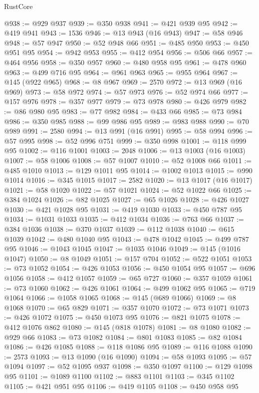 \begin{lexlean}{RustCore}
\begin{coremodule}
@938 := @929 @937
@939 := @350 @938
@941 := @421 @939 @95
@942 := @419 @941
@943 := 1536
@946 := @13 @943 (@16 @943)
@947 := @58 @946
@948 := @57 @947
@950 := @52 @948 @66
@951 := @485 @950
@953 := @450 @951 @95
@954 := @942 @953
@955 := @412 @954
@956 := @506 @66
@957 := @464 @956
@958 := @350 @957
@960 := @480 @958 @95
@961 := @478 @960
@963 := @499 @716 @95
@964 := @961 @963
@965 := @955 @964
@967 := @145 (@922 @965)
@968 := @8 @967
@969 := 2570
@972 := @13 @969 (@16 @969)
@973 := @58 @972
@974 := @57 @973
@976 := @52 @974 @66
@977 := @157 @976
@978 := @357 @977
@979 := @73 @978
@980 := @426 @979
@982 := @86 @980 @95
@983 := @77 @982
@984 := @433 @66
@985 := @73 @984
@986 := @350 @985
@988 := @99 @986 @95
@989 := @983 @988
@990 := @70 @989
@991 := 2580
@994 := @13 @991 (@16 @991)
@995 := @58 @994
@996 := @57 @995
@998 := @52 @996 @751
@999 := @350 @998
@1001 := @118 @999 @95
@1002 := @116 @1001
@1003 := 2048
@1006 := @13 @1003 (@16 @1003)
@1007 := @58 @1006
@1008 := @57 @1007
@1010 := @52 @1008 @66
@1011 := @485 @1010
@1013 := @129 @1011 @95
@1014 := @1002 @1013
@1015 := @990 @1014
@1016 := @345 @1015
@1017 := 2582
@1020 := @13 @1017 (@16 @1017)
@1021 := @58 @1020
@1022 := @57 @1021
@1024 := @52 @1022 @66
@1025 := @384 @1024
@1026 := @82 @1025
@1027 := @65 @1026
@1028 := @426 @1027
@1030 := @421 @1028 @95
@1031 := @419 @1030
@1033 := @450 @787 @95
@1034 := @1031 @1033
@1035 := @412 @1034
@1036 := @763 @66
@1037 := @384 @1036
@1038 := @370 @1037
@1039 := @112 @1038
@1040 := @615 @1039
@1042 := @480 @1040 @95
@1043 := @478 @1042
@1045 := @499 @787 @95
@1046 := @1043 @1045
@1047 := @1035 @1046
@1049 := @145 (@1016 @1047)
@1050 := @8 @1049
@1051 := @157 @704
@1052 := @522 @1051
@1053 := @73 @1052
@1054 := @426 @1053
@1056 := @450 @1054 @95
@1057 := @696 @1056
@1058 := @412 @1057
@1059 := @65 @727
@1060 := @357 @1059
@1061 := @73 @1060
@1062 := @426 @1061
@1064 := @499 @1062 @95
@1065 := @719 @1064
@1066 := @1058 @1065
@1068 := @145 (@689 @1066)
@1069 := @8 @1068
@1070 := @65 @829
@1071 := @357 @1070
@1072 := @73 @1071
@1073 := @426 @1072
@1075 := @450 @1073 @95
@1076 := @821 @1075
@1078 := @412 @1076 @862
@1080 := @145 (@818 @1078)
@1081 := @8 @1080
@1082 := @929 @66
@1083 := @73 @1082
@1084 := @801 @1083
@1085 := @82 @1084
@1086 := @426 @1085
@1088 := @118 @1086 @95
@1089 := @116 @1088
@1090 := 2573
@1093 := @13 @1090 (@16 @1090)
@1094 := @58 @1093
@1095 := @57 @1094
@1097 := @52 @1095 @937
@1098 := @350 @1097
@1100 := @129 @1098 @95
@1101 := @1089 @1100
@1102 := @883 @1101
@1103 := @345 @1102
@1105 := @421 @951 @95
@1106 := @419 @1105
@1108 := @450 @958 @95

\end{coremodule}
\end{lexlean}
